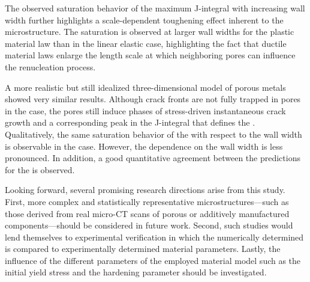\documentclass[pdflatex,sn-mathphys-num]{sn-jnl}%
\theoremstyle{thmstyleone}%
\theoremstyle{thmstyletwo}%
\theoremstyle{thmstylethree}%
\begin{document}
The observed saturation behavior of the maximum J-integral with increasing wall width further
highlights a scale-dependent toughening effect inherent to the microstructure. The saturation is
observed at larger wall widths for the plastic material law than in the linear elastic case,
highlighting the fact that ductile material laws enlarge the length scale at which neighboring pores
can influence the renucleation process.

A more realistic but still idealized three-dimensional model of porous metals showed very similar
results. Although crack fronts are not fully trapped in pores in the  case, the pores still induce
phases of stress-driven instantaneous crack growth and a corresponding peak in the J-integral that
defines the . Qualitatively, the same saturation behavior of the
 with respect to the wall width is observable in the  case. However,
the dependence on the wall width is less pronounced. In addition, a good quantitative agreement
between the  predictions for the  is observed.

Looking forward, several promising research directions arise from this study. 
First, more complex
and statistically representative microstructures—such 
as those derived from real micro-CT scans of
porous or additively manufactured components—should 
be considered in future work. Second, such studies would lend themselves to experimental
verification in which the numerically determined  is compared to 
experimentally determined material parameters. Lastly, the influence of the 
different parameters of the employed material model such as the initial yield stress and the hardening
parameter should be investigated.
\end{document}
